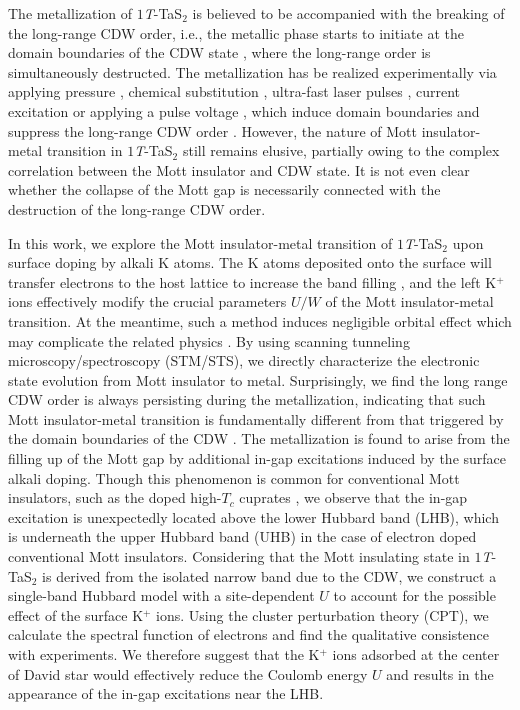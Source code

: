 \documentclass[aps,prl,reprint,groupedaddress,showpacs,amsfonts,amsmath,amssymb,superscriptaddress]{revtex4-1}
\begin{document}
The metallization of $1$\emph{T}-TaS$_{2}$ is believed to be accompanied with the breaking of the long-range CDW order, i.e., the metallic phase starts to initiate at the domain boundaries of the CDW state \cite{PhysRevLett.122.036802}, where the long-range order is simultaneously destructed. The metallization has be realized experimentally via applying pressure \cite{nmat2318},
chemical substitution \cite{PhysRevX.7.041054}, ultra-fast laser pulses \cite{Stojchevska177}, current excitation \cite{ncomms11442,Yoshidae1500606} or applying a pulse voltage \cite{ncomms10956}, which induce domain boundaries and suppress the long-range CDW order \cite{nmat2318,PhysRevX.7.041054,Stojchevska177,ncomms11442,Yoshidae1500606,ncomms10956}.  However, the nature of Mott insulator-metal transition in $1$\emph{T}-TaS$_{2}$ still remains elusive, partially owing to the complex correlation between the Mott insulator and CDW state. It is not even clear whether the collapse of the Mott gap is necessarily connected with the destruction of the long-range CDW order.


In this work, we explore the Mott insulator-metal transition of $1$\emph{T}-TaS$_{2}$ upon surface doping by alkali K atoms. The K atoms deposited onto the surface will transfer electrons to the host lattice to increase the band filling \cite{RAMIREZ2001424}, and the left K$^{+}$ ions effectively modify the crucial parameters $U/W$ of the Mott insulator-metal transition. At the meantime, such a method induces negligible orbital effect which may complicate the related physics \cite{PhysRevB.50.8816}.
By using scanning tunneling microscopy/spectroscopy (STM/STS), we directly characterize the electronic state evolution from Mott insulator to metal. Surprisingly, we find the long range CDW order is always persisting during the metallization, indicating that such Mott insulator-metal transition is fundamentally different from that triggered by the domain boundaries of the CDW \cite{PhysRevX.7.041054,PhysRevLett.95.126403,PhysRevLett.109.176403,PhysRevLett.112.206402}. The metallization is found to arise from the filling up of the Mott gap by additional in-gap excitations induced by the surface alkali doping. Though this phenomenon is common for conventional Mott insulators, such as the doped high-$T_c$ cuprates \cite{Nat.hys.12.1047}, we observe that the in-gap excitation is unexpectedly located above the lower Hubbard band (LHB), which is underneath the upper Hubbard band (UHB) in the case of electron doped conventional Mott insulators. Considering that the Mott insulating state in $1$\emph{T}-TaS$_{2}$ is derived from the isolated narrow band due to the CDW, we construct a single-band Hubbard model with a site-dependent $U$ to account for the possible effect of the surface K$^{+}$ ions. Using the cluster perturbation theory (CPT), we calculate the spectral function of electrons and find the qualitative consistence with experiments.
We therefore suggest that the K$^{+}$ ions adsorbed at the center of David star would effectively reduce the Coulomb energy $U$ and results in the appearance of the in-gap excitations near the LHB.
\end{document}
